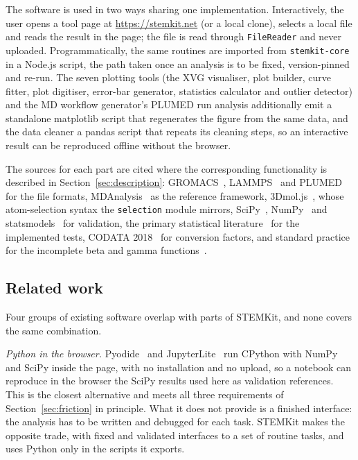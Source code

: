 \documentclass[11pt,a4paper]{article}
\begin{document}
The software is used in two ways sharing one implementation. Interactively, the
user opens a tool page at \url{https://stemkit.net} (or a local clone), selects
a local file and reads the result in the page; the file is read through
\texttt{FileReader} and never uploaded. Programmatically, the same routines are
imported from \texttt{stemkit-core} in a Node.js script, the path taken once an
analysis is to be fixed, version-pinned and re-run. The seven plotting tools
(the XVG visualiser, plot builder, curve fitter, plot digitiser, error-bar
generator, statistics calculator and outlier detector) and the MD workflow
generator's PLUMED run analysis additionally emit a standalone matplotlib script
that regenerates the figure from the same data, and the data cleaner a pandas
script that repeats its cleaning steps, so an interactive result can be
reproduced offline without the browser.

The sources for each part are cited where the corresponding functionality is
described in Section~\ref{sec:description}: GROMACS~\cite{abraham2015},
LAMMPS~\cite{thompson2022} and PLUMED~\cite{tribello2014} for the file formats,
MDAnalysis~\cite{michaud-agrawal2011mdanalysis} as the reference framework,
3Dmol.js~\cite{rego2015}, whose atom-selection syntax the \texttt{selection}
module mirrors, SciPy~\cite{virtanen2020}, NumPy~\cite{harris2020} and
statsmodels~\cite{seabold2010} for validation, the primary statistical
literature~\cite{welch1947,welch1951,spearman1904,kruskal1952,tukey1949,kramer1956,games1976,dunn1964,dagostino1973,brown1974,holm1979,iglewicz1993,grubbs1969,bonett2000}
for the implemented tests, CODATA 2018~\cite{tiesinga2021} for conversion
factors, and standard practice for the incomplete beta and gamma
functions~\cite{press2007}.

\subsection{Related work}\label{sec:related}

Four groups of existing software overlap with parts of STEMKit, and none covers
the same combination.

\emph{Python in the browser.} Pyodide~\cite{pyodide} and
JupyterLite~\cite{jupyterlite} run CPython with NumPy and SciPy inside the page,
with no installation and no upload, so a notebook can reproduce in the browser
the SciPy results used here as validation references. This is the closest
alternative and meets all three requirements of Section~\ref{sec:friction} in
principle. What it does not provide is a finished interface: the analysis has to
be written and debugged for each task. STEMKit makes the opposite trade, with
fixed and validated interfaces to a set of routine tasks, and uses Python only
in the scripts it exports.
\end{document}
